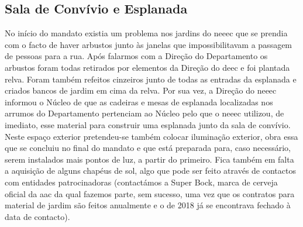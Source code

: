 
\subsection{Sala de Convívio e Esplanada}

No início do mandato existia um problema nos jardins do \acrshort{neeec} que se prendia com o facto de haver arbustos junto às janelas que impossibilitavam a passagem de pessoas para a rua. Após falarmos com a Direção do Departamento os arbustos foram todas retirados por elementos da Direção do \acrshort{deec} e foi plantada relva. Foram também refeitos cinzeiros junto de todas as entradas da esplanada e criados bancos de jardim em cima da relva. Por sua vez, a Direção do \acrshort{neeec} informou o Núcleo de que as cadeiras e mesas de esplanada localizadas nos arrumos do Departamento pertenciam ao Núcleo pelo que o \acrshort{neeec} utilizou, de imediato, esse material para construir uma esplanada junto da sala de convívio. Neste espaço exterior pretendeu-se também colocar iluminação exterior, obra essa que se concluiu no final do mandato e que está preparada para, caso necessário, serem instalados mais pontos de luz, a partir do primeiro. Fica também em falta a aquisição de alguns chapéus de sol, algo que pode ser feito através de contactos com entidades patrocinadoras (contactámos a Super Bock, marca de cerveja oficial da \acrshort{aac} da qual fazemos parte, sem sucesso, uma vez que os contratos para material de jardim são feitos anualmente e o de 2018 já se encontrava fechado à data de contacto).

